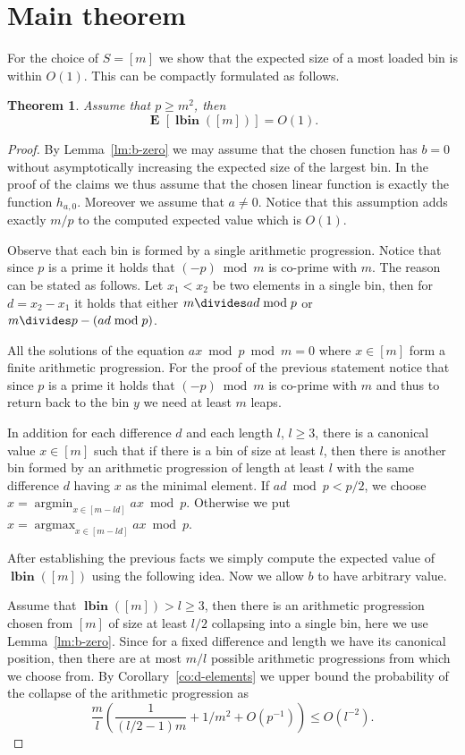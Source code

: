 \documentclass{article}
\newcommand{\vlbin}[1]{\operatorname{\mathbf{lbin}}({#1})}
\newcommand{\expects}[2]{\operatorname{\mathbf{E}}_{{#1}}\left[{#2}\right]}
\newcommand{\expect}[1]{\expects{}{#1}}
\newtheorem{theorem}{Theorem}
\begin{document}
\section{Main theorem}

For the choice of $S = [m]$ we show that the expected size of a most loaded bin is within $O(1)$. 
This can be compactly formulated as follows.
\begin{theorem}
\label{thm:interval-constant}
Assume that $p \geq m^2$, then
\[
\expect{\vlbin{[m]}} = O(1).
\]
\end{theorem}
\begin{proof}
By Lemma~\ref{lm:b-zero} we may assume that the chosen function has $b = 0$ without asymptotically increasing the expected size of the largest bin. In the proof of the claims we thus assume that the chosen linear function is exactly the function $h_{a, 0}$. Moreover we assume that $a \neq 0$. Notice that this assumption adds exactly $m/p$ to the computed expected value which is $O(1)$.

Observe that each bin is formed by a single arithmetic progression. Notice that since $p$ is a prime it holds that $(-p) \bmod m$ is co-prime with $m$.
The reason can be stated as follows.
Let $x_1 < x_2$ be two elements in a single bin, then for $d = x_2 - x_1$ it holds that either $m \divides ad \bmod p$ or $m \divides p - (ad \bmod p)$.

All the solutions of the equation $ax \bmod p \bmod m = 0$ where $x \in [m]$ form a finite arithmetic progression.
For the proof of the previous statement notice that since $p$ is a prime it holds that $(-p) \bmod m$ is co-prime with $m$ and thus to return back to the bin $y$ we need at least $m$ leaps. 

In addition for each difference $d$ and each length $l$, $l \geq 3$, there is a canonical value $x \in [m]$ such that if there is a bin of size at least $l$, then there is another bin formed by an arithmetic progression of length at least $l$ with the same difference $d$ having $x$ as the minimal element. If $ad \bmod p < p/2$, we choose $x = \operatorname{argmin}_{x \in [m - ld]} ax \bmod p$. Otherwise we put $x = \operatorname{argmax}_{x \in [m - ld]} ax \bmod p$.

After establishing the previous facts we simply compute the expected value of $\vlbin{[m]}$ using the following idea. Now we allow $b$ to have arbitrary value.

Assume that $\vlbin{[m]} > l \geq 3$, then there is an arithmetic progression chosen from $[m]$ of size at least $l/2$ collapsing into a single bin, here we use Lemma~\ref{lm:b-zero}. Since for a fixed difference and length we have its canonical position, then there are at most $m/l$ possible arithmetic progressions from which we choose from. By Corollary~\ref{co:d-elements} we upper bound the probability of the collapse of the arithmetic progression as 
\[
\frac{m}{l} \left(\frac{1}{(l/2 - 1)m} + 1/m^2 + O(p^{-1})\right) \leq O(l^{-2}).
\]



\end{proof}
\end{document}

